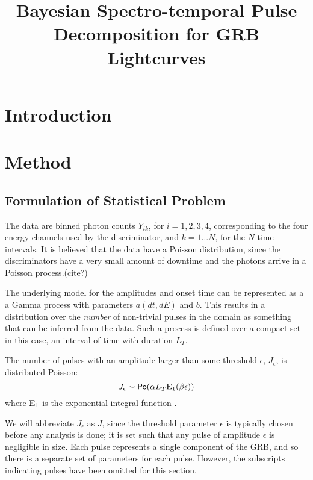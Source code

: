 \documentclass[12pt,letterpaper]{article}
\title{Bayesian Spectro-temporal Pulse Decomposition for GRB Lightcurves}
\author{}
\begin{document}
\maketitle
\doublespacing
\section{Introduction}
\section{Method}

     \subsection{Formulation of Statistical Problem}
     The data are binned photon counts $Y_{ik}$, for $i  = 1,2,3,4$, corresponding to the four energy channels used by the discriminator, and $k = 1 \dots N$, for the $N$ time intervals.
 It is believed that the data have a Poisson distribution, since the discriminators have a very small amount of downtime and the photons arrive in a Poisson process.(cite?)     
     
    The underlying model for the amplitudes and onset time can be represented as a a Gamma process with parameters $a( dt, dE )$ and $b$.  This results in a distribution over the \emph{number} of non-trivial pulses in the domain as something that can be inferred from the data. Such a process is defined over a compact set - in this case, an interval of time with duration $L_T$.
    
     The number of pulses  with an amplitude larger than some threshold $\epsilon$, $J_\epsilon$, is  distributed Poisson:
     \begin{equation}
J_\epsilon \sim \mathsf{Po}(\alpha L_T  {\mathrm{E}_1}(\beta \epsilon) )      
     \end{equation}\label{eq:prior-J}
where ${\mathrm{E}_1}$ is the exponential integral function \citet{Abra:Steg:1964}.
     
We will abbreviate $J_\epsilon$ as $J$, since the threshold parameter $\epsilon$ is typically chosen before any analysis is done; it is set such that any pulse of amplitude $\epsilon$ is negligible in size. Each pulse represents a single component of the GRB, and so there is a separate set of parameters for each pulse. However, the subscripts indicating pulses have been omitted for this section. 
\end{document}
